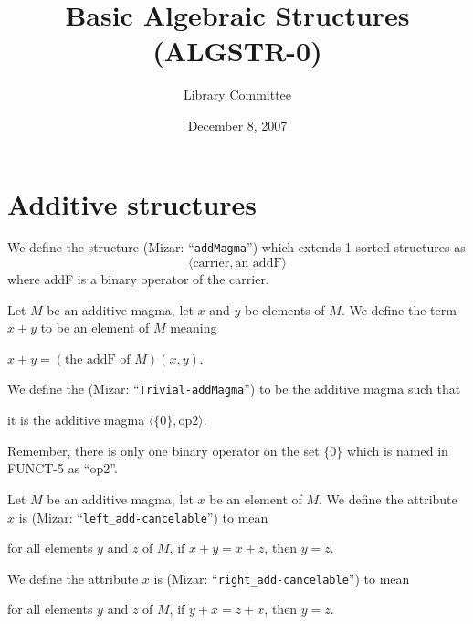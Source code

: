 \documentclass{article}
\title{Basic Algebraic Structures (ALGSTR-0)}
\author{Library Committee}
\date{December 8, 2007}
\begin{document}
\maketitle

\section{Additive structures}

\begin{definition}
We define the structure  (Mizar: ``\verb#addMagma#'')
which extends 1-sorted structures as
\[\langle\mbox{carrier}, \mbox{an addF}\rangle\]
where addF is a binary operator of the carrier.
\end{definition}

\begin{definition}
Let $M$ be an additive magma, let $x$ and $y$ be elements of $M$.
We define the term $x+y$ to be an element of $M$ meaning
\begin{defn}
\item $x+y = (\mbox{the addF of $M$})(x,y)$.
\end{defn}
\end{definition}

\begin{definition}
We define the   (Mizar: ``\verb#Trivial-addMagma#'')
to be the additive magma such that
\begin{defn}
\item it is the additive magma $\langle\{0\},\mbox{op2}\rangle$.
\end{defn}
\end{definition}

\begin{remark}
Remember, there is only one binary operator on the set $\{0\}$ which is
named in FUNCT-5 as ``op2''.
\end{remark}

\begin{definition}
Let $M$ be an additive magma, let $x$ be an element of $M$.
We define the attribute $x$ is   (Mizar: ``\verb#left_add-cancelable#'')
to mean
\begin{defn}
\item for all elements $y$ and $z$ of $M$, if $x+y=x+z$, then $y=z$.
\end{defn}
We define the attribute $x$ is   (Mizar: ``\verb#right_add-cancelable#'')
to mean
\begin{defn}%
\item for all elements $y$ and $z$ of $M$, if $y+x=z+x$, then $y=z$.
\end{defn}
\end{definition}
\end{document}
